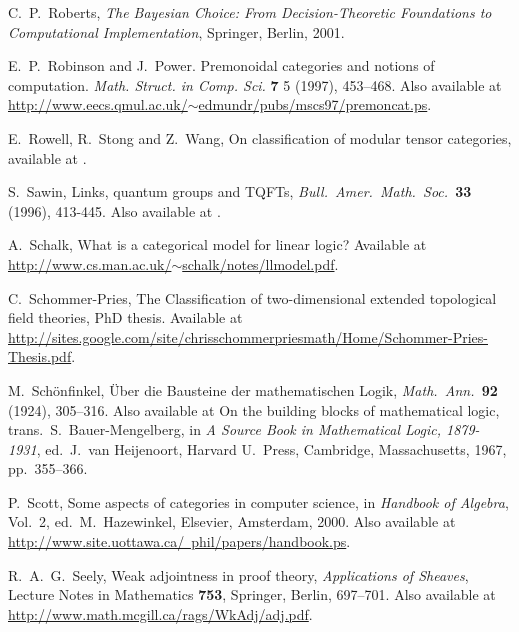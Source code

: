 \documentclass[12pt,twoside,openright]{report}
\begin{document}
\begin{thebibliography}{99}
 C.\ P.\ Roberts, 
{\sl The Bayesian Choice: From Decision-Theoretic Foundations to Computational Implementation}, Springer, Berlin, 2001.

 E.\ P.\ Robinson and J.\ Power. Premonoidal categories and notions of computation. \textsl{Math. Struct. in Comp. Sci.} \textbf{7} 5 (1997), 453--468.  Also available at \href{http://www.eecs.qmul.ac.uk/~edmundr/pubs/mscs97/premoncat.ps}{http://www.eecs.qmul.ac.uk/$\sim$edmundr/pubs/mscs97/premoncat.ps}.

 E.\ Rowell, R.\ Stong and Z.\ Wang, On classification of modular tensor categories, available at .

 S.\ Sawin, Links, quantum groups and TQFTs,
{\sl Bull.\ Amer.\ Math.\ Soc.\ }{\bf 33} (1996), 413-445. Also available at .

 A.\ Schalk, What is a categorical model for linear logic?  Available at \hfill \break
\href{http://www.cs.man.ac.uk/~schalk/notes/llmodel.pdf}
{http://www.cs.man.ac.uk/$\sim$schalk/notes/llmodel.pdf}.

 C.\ Schommer-Pries, The Classification of two-dimensional extended topological field theories, PhD thesis. Available at
\href{http://sites.google.com/site/chrisschommerpriesmath/Home/Schommer-Pries-Thesis.pdf}{http://sites.google.com/site/chrisschommerpriesmath/Home/Schommer-Pries-Thesis.pdf}.

 M.\ Sch\"onfinkel, \"Uber die Bausteine der mathematischen Logik, {\sl Math.\ Ann.\ }{\bf 92} (1924), 305--316. Also available at On the building blocks of mathematical logic, trans.\ S.\ Bauer-Mengelberg, in {\sl A Source Book in Mathematical Logic, 1879-1931}, ed.\ J.\ van Heijenoort, Harvard U.\ Press, Cambridge, Massachusetts, 1967, pp.\ 355--366.

 P.\ Scott, Some aspects of categories in computer science, in {\sl Handbook of Algebra}, Vol.\ 2, ed.\ M.\ Hazewinkel, Elsevier, Amsterdam, 2000. Also available at \\
\href{http://www.site.uottawa.ca/~phil/papers/handbook.ps}
{http://www.site.uottawa.ca/~phil/papers/handbook.ps}.

 R.\ A.\ G.\ Seely, Weak adjointness in proof theory,
{\sl Applications of Sheaves}, Lecture Notes in Mathematics {\bf 753}, Springer, Berlin, 697--701.  Also available at \hfill \break
\href{http://www.math.mcgill.ca/rags/WkAdj/adj.pdf}
{http://www.math.mcgill.ca/rags/WkAdj/adj.pdf}.


\end{thebibliography}
\end{document}
